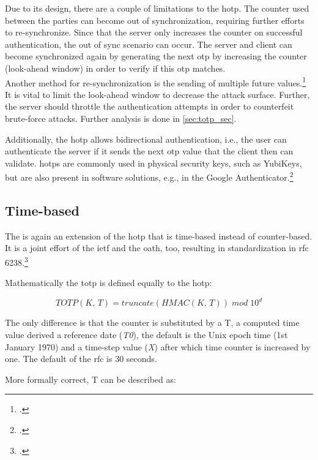 Due to its design, there are a couple of limitations to the \gls{hotp}. The counter used between the parties can become out of synchronization, requiring further efforts to re-synchronize. Since that the server only increases the counter on successful authentication, the out of sync scenario can occur. The server and client can become synchronized again by generating the next \gls{otp} by increasing the counter (look-ahead window) in order to verify if this \gls{otp} matches.\\
Another method for re-synchronization is the sending of multiple future values.\footcites[See][236]{Schwartz2018}[See][Chapter 13.5.1]{2308830} It is vital to limit the look-ahead window to decrease the attack surface. Further, the server should throttle the authentication attempts in order to counterfeit brute-force attacks. Further analysis is done in \autoref{sec:totp_sec}.

Additionally, the \gls{hotp} allows bidirectional authentication, i.e., the user can authenticate the server if it sends the next \gls{otp} value that the client then can validate. \Glspl{hotp} are commonly used in physical security keys, such as YubiKeys, but are also present in software solutions, e.g., in the Google Authenticator.\footcites[See][716]{Vacca2017aa}[See][14]{m2005rfc}

\subsection{Time-based}
\label{subsec:totp}

The  is again an extension of the \gls{hotp} that is time-based instead of counter-based. It is a joint effort of the \gls{ietf} and the \gls{oath}, too, resulting in standardization in \gls{rfc} 6238.\footcite[See][]{m2011rfc}

Mathematically the \gls{totp} is defined equally to the \gls{hotp}:

\begin{equation*}
	TOTP(K,\, T) = truncate(HMAC(K,\, T))\; mod \; 10^d
\end{equation*}

The only difference is that the counter is substituted by a T, a computed time value derived a reference date (\textit{T0}), the default is the Unix epoch time (1st January 1970) and a time-step value (\textit{X}) after which time counter is increased by one. The default of the \gls{rfc} is 30 seconds.

More formally correct, T can be described as:

